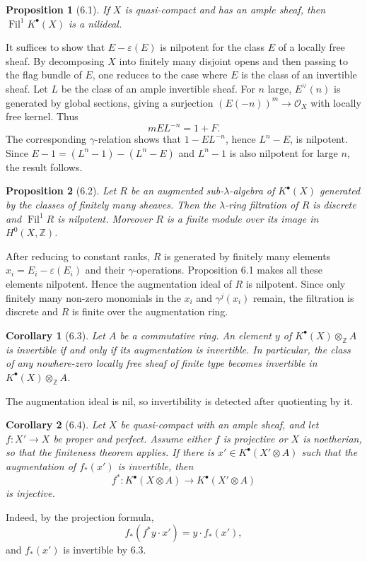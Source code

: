 \documentclass[13pt]{extarticle}
\newcommand{\ZZ}{\mathbb Z}
\newcommand{\cO}{\mathcal O}
\newcommand{\Fil}{\operatorname{Fil}}
\newtheorem*{proposition}{Proposition}
\newtheorem*{corollary}{Corollary}
\begin{document}
\begin{proposition}[6.1]
If $X$ is quasi-compact and has an ample sheaf, then $\Fil^1K^{\bullet}(X)$ is a nilideal.
\end{proposition}

It suffices to show that $E-\varepsilon(E)$ is nilpotent for the class $E$ of a locally free sheaf. By decomposing $X$ into finitely many disjoint opens and then passing to the flag bundle of $E$, one reduces to the case where $E$ is the class of an invertible sheaf. Let $L$ be the class of an ample invertible sheaf. For $n$ large, $E^{\vee}(n)$ is generated by global sections, giving a surjection $(E(-n))^m\to\cO_X$ with locally free kernel. Thus
\[
mEL^{-n}=1+F.
\]
The corresponding $\gamma$-relation shows that $1-EL^{-n}$, hence $L^n-E$, is nilpotent. Since $E-1=(L^n-1)-(L^n-E)$ and $L^n-1$ is also nilpotent for large $n$, the result follows.

\begin{proposition}[6.2]
Let $R$ be an augmented sub-$\lambda$-algebra of $K^{\bullet}(X)$ generated by the classes of finitely many sheaves. Then the $\lambda$-ring filtration of $R$ is discrete and $\Fil^1R$ is nilpotent. Moreover $R$ is a finite module over its image in $H^0(X,\ZZ)$.
\end{proposition}

After reducing to constant ranks, $R$ is generated by finitely many elements $x_i=E_i-\varepsilon(E_i)$ and their $\gamma$-operations. Proposition 6.1 makes all these elements nilpotent. Hence the augmentation ideal of $R$ is nilpotent. Since only finitely many non-zero monomials in the $x_i$ and $\gamma^j(x_i)$ remain, the filtration is discrete and $R$ is finite over the augmentation ring.

\begin{corollary}[6.3]
Let $A$ be a commutative ring. An element $y$ of $K^{\bullet}(X)\otimes_{\ZZ}A$ is invertible if and only if its augmentation is invertible. In particular, the class of any nowhere-zero locally free sheaf of finite type becomes invertible in $K^{\bullet}(X)\otimes_{\ZZ}A$.
\end{corollary}
The augmentation ideal is nil, so invertibility is detected after quotienting by it.

\begin{corollary}[6.4]
Let $X$ be quasi-compact with an ample sheaf, and let $f:X'\to X$ be proper and perfect. Assume either $f$ is projective or $X$ is noetherian, so that the finiteness theorem applies. If there is $x'\in K^{\bullet}(X'\otimes A)$ such that the augmentation of $f_*(x')$ is invertible, then
\[
f^*:K^{\bullet}(X\otimes A)\to K^{\bullet}(X'\otimes A)
\]
is injective.
\end{corollary}
Indeed, by the projection formula,
\[
f_*(f^*y\cdot x')=y\cdot f_*(x'),
\]
and $f_*(x')$ is invertible by 6.3.
\end{document}
